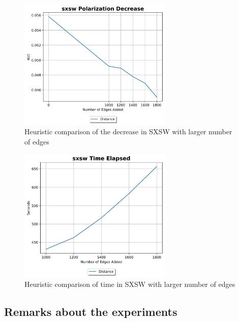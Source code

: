 \clearpage

\begin{figure}[H]
	\centering
	\includegraphics[width=0.65\textwidth]{Figures/sxsw Polarization Decrease 2}
	\caption{Heuristic comparison of the decrease in SXSW with larger number of edges}
	\label{fig:sxsw_pol}
\end{figure}


\begin{figure}[H]
	\centering
	\includegraphics[width=0.65\textwidth]{Figures/sxsw Time Elapsed 2}
	\caption{Heuristic comparison of time in SXSW with larger number of edges}
	\label{fig:sxsw_time}
\end{figure}

\clearpage

\subsection{Remarks about the experiments}

